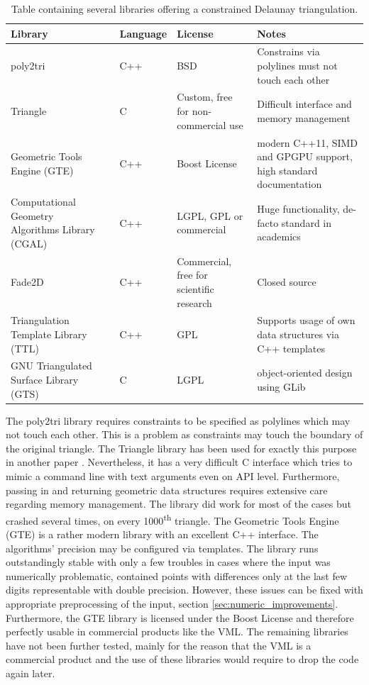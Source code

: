 \renewcommand{\arraystretch}{1.5} %
\begin{table}[h]
	\centering
	\begin{tabular}{p{3cm} l l p{2.1cm} p{3.9cm}}
		Library & & Language & License & Notes \\
		\hline
		poly2tri & \cite{poly2tri} & C++ & BSD & Constrains via polylines must not touch each other \\
		Triangle & \cite{triangle_lib} & C & Custom, free for non-commercial use & Difficult interface and memory management \\
		Geometric Tools Engine (GTE) & \cite{gte} & C++ & Boost License & modern C++11, SIMD and GPGPU support, high standard documentation \\
		Computational Geometry Algorithms Library (CGAL) & \cite{cgal_triangulation} & C++ & LGPL, GPL or commercial & Huge functionality, de-facto standard in academics \\
		Fade2D & \cite{fade2d} & C++ & Commercial, free for scientific research & Closed source \\
		Triangulation Template Library (TTL) & \cite{ttl} & C++ & GPL & Supports usage of own data structures via C++ templates \\
		GNU Triangulated Surface Library (GTS) & \cite{gts} & C & LGPL & object-oriented design using GLib\\
		
	\end{tabular}
	\caption{
		Table containing several libraries offering a constrained Delaunay triangulation.
	}
	\label{tbl:delaunay_libs}
\end{table}
\renewcommand{\arraystretch}{1.0}

The poly2tri library requires constraints to be specified as polylines which may not touch each other.
This is a problem as constraints may touch the boundary of the original triangle.
%
The Triangle library has been used for exactly this purpose in another paper \cite{mesh_intersection}.
Nevertheless, it has a very difficult C interface which tries to mimic a command line with text arguments even on API level.
Furthermore, passing in and returning geometric data structures requires extensive care regarding memory management.
The library did work for most of the cases but crashed several times, \eg on every 1000\textsuperscript{th} triangle.  
%
The Geometric Tools Engine (GTE) is a rather modern library with an excellent C++ interface.
The algorithms' precision may be configured via templates.
The library runs outstandingly stable with only a few troubles in cases where the input was numerically problematic, \eg contained points with differences only at the last few digits representable with double precision.
However, these issues can be fixed with appropriate preprocessing of the input, \cf section \ref{sec:numeric_improvements}.
Furthermore, the GTE library is licensed under the Boost License and therefore perfectly usable in commercial products like the VML.
%
The remaining libraries have not been further tested, mainly for the reason that the VML is a commercial product and the use of these libraries would require to drop the code again later.

